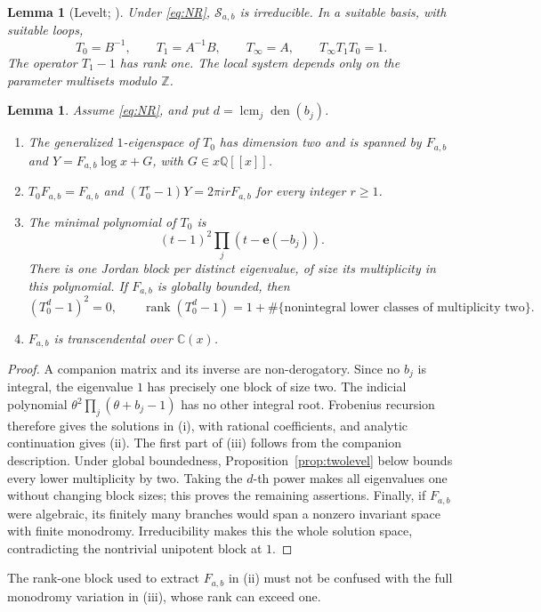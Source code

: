 \documentclass[11pt]{amsart}
\newtheorem{lemma}[theorem]{Lemma}
\theoremstyle{definition}
\theoremstyle{remark}
\numberwithin{equation}{section}
\newcommand{\Q}{\mathbb{Q}}
\newcommand{\Z}{\mathbb{Z}}
\newcommand{\C}{\mathbb{C}}
\newcommand{\e}{\mathbf{e}}
\newcommand{\cS}{\mathcal{S}}
\DeclareMathOperator{\rank}{rank}
\newcommand{\Fab}{F_{a,b}}
\newcommand{\Sab}{\cS_{a,b}}
\begin{document}
\begin{lemma}[{Levelt; \citep[Propositions~3.2--3.3, Theorem~3.5]{BeukersHeckman1989}}]\label{lem:levelt}
Under \eqref{eq:NR}, $\Sab$ is irreducible. In a suitable basis, with suitable loops,
\[
T_0=B^{-1},\qquad T_1=A^{-1}B,\qquad T_\infty=A,\qquad T_\infty T_1T_0=1.
\]
The operator $T_1-1$ has rank one. The local system depends only on the parameter multisets modulo $\Z$.
\end{lemma}

\begin{lemma}\label{lem:local0}
Assume \eqref{eq:NR}, and put $d=\operatorname{lcm}_j\operatorname{den}(b_j)$.
\begin{enumerate}[label=\textup{(\roman*)},leftmargin=2em]
\item The generalized $1$-eigenspace of $T_0$ has dimension two and is spanned by $\Fab$ and $Y=\Fab\log x+G$, with $G\in x\Q[[x]]$.
\item $T_0\Fab=\Fab$ and $(T_0^r-1)Y=2\pi i r\Fab$ for every integer $r\ge1$.
\item The minimal polynomial of $T_0$ is
\[
(t-1)^2\prod_j(t-\e(-b_j)).
\]
There is one Jordan block per distinct eigenvalue, of size its multiplicity in this polynomial. If $\Fab$ is globally bounded, then
\[
(T_0^d-1)^2=0,\qquad
\rank(T_0^d-1)=1+\#\{\text{nonintegral lower classes of multiplicity two}\}.
\]
\item $\Fab$ is transcendental over $\C(x)$.
\end{enumerate}
\end{lemma}
\begin{proof}
A companion matrix and its inverse are non-derogatory. Since no $b_j$ is integral, the eigenvalue $1$ has precisely one block of size two. The indicial polynomial $\theta^2\prod_j(\theta+b_j-1)$ has no other integral root. Frobenius recursion therefore gives the solutions in (i), with rational coefficients, and analytic continuation gives (ii). The first part of (iii) follows from the companion description. Under global boundedness, Proposition~\ref{prop:twolevel} below bounds every lower multiplicity by two. Taking the $d$-th power makes all eigenvalues one without changing block sizes; this proves the remaining assertions. Finally, if $\Fab$ were algebraic, its finitely many branches would span a nonzero invariant space with finite monodromy. Irreducibility makes this the whole solution space, contradicting the nontrivial unipotent block at $1$.
\end{proof}
The rank-one block used to extract $\Fab$ in (ii) must not be confused with the full monodromy variation in (iii), whose rank can exceed one.
\end{document}
